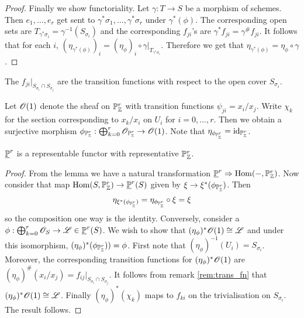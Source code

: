 \documentclass{memoir}
\begin{document}
\begin{proof}
    Finally we show functoriality.
    Let $\gamma:T\to S$ be a morphism of schemes.
    Then $e_1,\dots,e_r$ get sent to $\gamma^*\sigma_1,\dots,\gamma^*\sigma_r$ under $\gamma^*(\phi)$.
    The corresponding open sets are $T_{\gamma^*\sigma_i} = \gamma^{-1}(S_{\sigma_i})$ and the corresponding $f_{ji}$'s are $\gamma^*f_{ji} = \gamma^\#f_{ji}$.
    It follows that for each $i$, $(\eta_{\gamma^*(\phi)})_i = (\eta_\phi)_i\circ \gamma|_{T_{\gamma^*\sigma_i}}$.
    Therefore we get that $\eta_{\gamma^*(\phi)} = \eta_\phi\circ \gamma$.
\end{proof}
\begin{remark}
    \label{rem:trans_fn}
    The $f_{ji}|_{S_{\sigma_i}\cap S_{\sigma_j}}$ are the transition functions with respect to the open cover $S_{\sigma_i}$.
\end{remark}
\begin{definition}
    Let $\shf{O}(1)$ denote the sheaf on $\P^r_\Z$ with transition functions $\psi_{ji} = x_i/x_j$.
    Write $\chi_k$ for the section corresponding to $x_k/x_i$ on $U_i$ for $i=0,\dots,r$.
    Then we obtain a surjective morphism $\phi_{\P^r_\Z}:\bigoplus_{k=0}^r\shf{O}_{\P^r_\Z} \to \shf{O}(1)$.
    Note that $\eta_{\phi_{\P^r_\Z}} = \id_{\P^r_\Z}$.
\end{definition}
\begin{thm}
    $\underline \P^r$ is a representable functor with representative $\P^r_\Z$.
\end{thm}
\begin{proof}
    From the lemma we have a natural transformation $\underline \P^r \Rightarrow \Hom(-,\P^r_\Z)$.
    Now consider that map $\Hom(S,\P^r_\Z) \to \underline \P^r(S)$ given by $\xi \to \xi^*(\phi_{\P^r_\Z})$.
    Then 
    \begin{equation}
        \eta_{\xi^*(\phi_{\P^r_\Z})} = \eta_{\phi_{\P^r_\Z}} \circ \xi = \xi
    \end{equation}
    so the composition one way is the identity.
    Conversely, consider a $\phi: \bigoplus_{k=0}^r\shf{O}_S\to \shf L\in \underline \P^r(S)$.
    We wish to show that $(\eta_\phi)^*\shf{O}(1) \cong \shf L$ and under this isomorphism, $(\eta_\phi)^*(\phi_{\P^r_\Z})) = \phi$.
    First note that $(\eta_\phi)^{-1}(U_i) = S_{\sigma_i}$.
    Moreover, the corresponding transition functions for $(\eta_\phi)^*\shf{O}(1)$ are $(\eta_\phi)^\#(x_i/x_j) = f_{ij}|_{S_{\sigma_i} \cap S_{\sigma_j}}$.
    It follows from remark \ref{rem:trans_fn} that $(\eta_\phi)^*\shf{O}(1) \cong \shf L$.
    Finally $(\eta_\phi)^*(\chi_k)$ maps to $f_{ki}$ on the trivialisation on $S_{\sigma_i}$.
    The result follows.
\end{proof}
\end{document}
